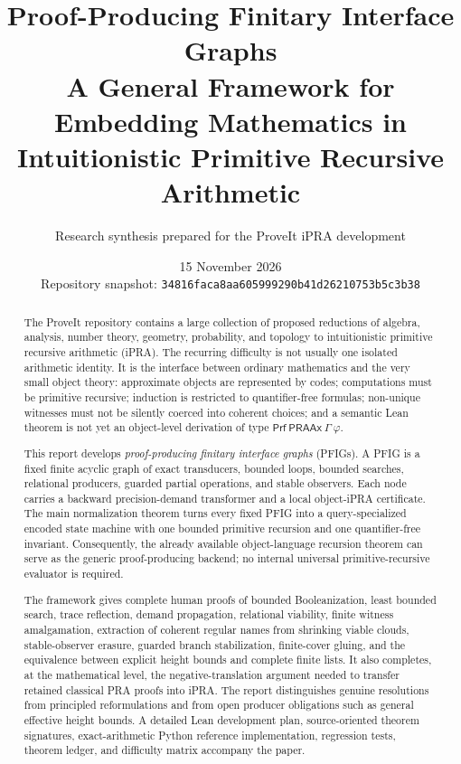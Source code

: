 \documentclass[11pt,oneside]{article}
\title{\textbf{Proof-Producing Finitary Interface Graphs}\\
A General Framework for Embedding Mathematics in Intuitionistic Primitive Recursive Arithmetic}
\author{Research synthesis prepared for the ProveIt iPRA development}
\date{15 November 2026\\Repository snapshot: \texttt{34816faca8aa605999290b41d26210753b5c3b38}}
\theoremstyle{remark}
\newcommand{\Prf}{\mathsf{Prf}}
\newcommand{\PRAAx}{\mathsf{PRAAx}}
\begin{document}
\maketitle

\begin{abstract}
The ProveIt repository contains a large collection of proposed reductions of algebra, analysis, number theory, geometry, probability, and topology to intuitionistic primitive recursive arithmetic (iPRA).  The recurring difficulty is not usually one isolated arithmetic identity.  It is the interface between ordinary mathematics and the very small object theory: approximate objects are represented by codes; computations must be primitive recursive; induction is restricted to quantifier-free formulas; non-unique witnesses must not be silently coerced into coherent choices; and a semantic Lean theorem is not yet an object-level derivation of type \(\Prf\ \PRAAx\ \Gamma\ \varphi\).

This report develops \emph{proof-producing finitary interface graphs} (PFIGs).  A PFIG is a fixed finite acyclic graph of exact transducers, bounded loops, bounded searches, relational producers, guarded partial operations, and stable observers.  Each node carries a backward precision-demand transformer and a local object-iPRA certificate.  The main normalization theorem turns every fixed PFIG into a query-specialized encoded state machine with one bounded primitive recursion and one quantifier-free invariant.  Consequently, the already available object-language recursion theorem can serve as the generic proof-producing backend; no internal universal primitive-recursive evaluator is required.

The framework gives complete human proofs of bounded Booleanization, least bounded search, trace reflection, demand propagation, relational viability, finite witness amalgamation, extraction of coherent regular names from shrinking viable clouds, stable-observer erasure, guarded branch stabilization, finite-cover gluing, and the equivalence between explicit height bounds and complete finite lists.  It also completes, at the mathematical level, the negative-translation argument needed to transfer retained classical PRA proofs into iPRA.  The report distinguishes genuine resolutions from principled reformulations and from open producer obligations such as general effective height bounds.  A detailed Lean development plan, source-oriented theorem signatures, exact-arithmetic Python reference implementation, regression tests, theorem ledger, and difficulty matrix accompany the paper.
\end{abstract}
\end{document}
